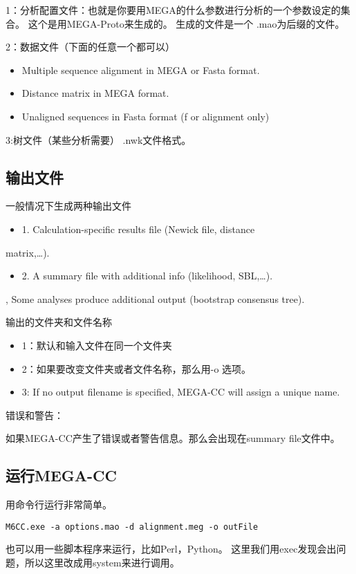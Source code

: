\documentclass{ctexart}
\begin{document}
1：分析配置文件：也就是你要用MEGA的什么参数进行分析的一个参数设定的集合。
这个是用MEGA-Proto来生成的。
生成的文件是一个 .mao为后缀的文件。

2：数据文件（下面的任意一个都可以）
\begin{itemize}
\item Multiple sequence alignment in MEGA or Fasta format.
\item Distance matrix in MEGA format.
\item Unaligned sequences in Fasta format (f or alignment only)
\end{itemize}

3:树文件（某些分析需要） .nwk文件格式。
\subsection{输出文件}
\label{sec-3-3}

一般情况下生成两种输出文件

\begin{itemize}
\item 1. Calculation-specific results file (Newick file, distance
\end{itemize}
  matrix,…). 
\begin{itemize}
\item 2. A summary file with additional info (likelihood, SBL,…).
\end{itemize}
  , Some analyses produce additional output (bootstrap consensus 
  tree).
 
输出的文件夹和文件名称

\begin{itemize}
\item 1：默认和输入文件在同一个文件夹
\item 2：如果要改变文件夹或者文件名称，那么用-o 选项。
\item 3: If no output filename is specified, MEGA-CC will assign a unique 
  name.
\end{itemize}

错误和警告：

如果MEGA-CC产生了错误或者警告信息。那么会出现在summary file文件中。
\subsection{运行MEGA-CC}
\label{sec-3-4}

用命令行运行非常简单。

\lstset{frame=trBL,frameround=fttt,breaklines=true,language=Perl}
\begin{lstlisting}
M6CC.exe -a options.mao -d alignment.meg -o outFile
\end{lstlisting}
也可以用一些脚本程序来运行，比如Perl，Python。
这里我们用exec发现会出问题，所以这里改成用system来进行调用。
\end{document}
